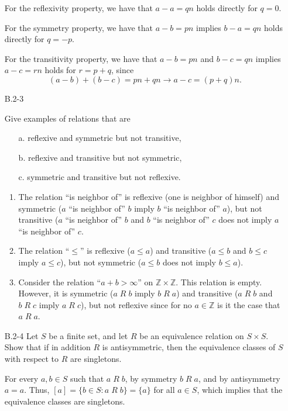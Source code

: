 \begin{enumerate}
\begin{framed}
For the reflexivity property, we have that $a - a = qn$ holds directly for $q = 0$.

For the symmetry property, we have that $a - b = p n$ implies $b - a = q n$ holds directly for $q = -p$.

For the transitivity property, we have that $a - b = pn$ and $b - c = qn$ implies $a - c = rn$ holds for $r = p + q$, since
\[
  (a - b) + (b - c) = pn + qn \rightarrow a - c = (p + q) n.
\]

\end{framed}

\item[B.2{-}3]{Give examples of relations that are
\begin{enumerate}
\item[a.] reflexive and symmetric but not transitive,
\item[b.] reflexive and transitive but not symmetric,
\item[c.] symmetric and transitive but not reflexive.
\end{enumerate}
}

\begin{framed}
\begin{enumerate}
\item The relation ``is neighbor of'' is reflexive (one is neighbor of
  himself) and symmetric ($a$ ``is neighbor of'' $b$ imply $b$ ``is neighbor
  of'' $a$), but not transitive ($a$ ``is neighbor of'' $b$ and $b$ ``is
  neighbor of'' $c$ does not imply $a$ ``is neighbor of'' $c$.
\item The relation ``$\le$'' is reflexive ($a \le a$) and transitive ($a \le b$
  and $b \le c$ imply $a \le c$), but not symmetric ($a \le b$ does not imply
  $b \le a$).
\item Consider the relation ``$a + b > \infty$'' on $\mathbb{Z} \times \mathbb{Z}$.
  This relation is empty. However, it is symmetric ($a\;R\;b$ imply $b\;R\;a$)
  and transitive ($a\;R\;b$ and $b\;R\;c$ imply $a\;R\;c$), but not reflexive
  since for no $a \in \mathbb{Z}$ is it the case that $a\;R\;a$.
\end{enumerate}
\end{framed}

\item[B.2{-}4]{Let $S$ be a finite set, and let $R$ be an equivalence relation
on $S \times S$. Show that if in addition $R$ is antisymmetric, then the
equivalence classes of $S$ with respect to $R$ are singletons.}

\begin{framed}
For every $a, b \in S$ such that $a\;R\;b$, by symmetry $b\;R\;a$, and by
antisymmetry $a = a$. Thus, $[a] = \{b \in S : a\;R\;b\} = \{a\}$ for all
$a \in S$, which implies that the equivalence classes are singletons.
\end{framed}


\end{enumerate}
